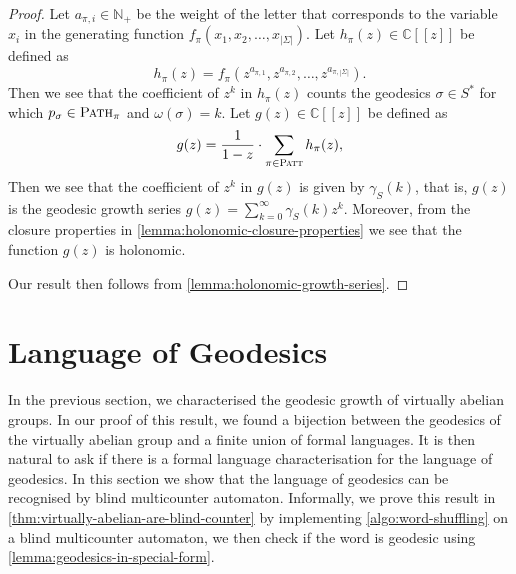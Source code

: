 \begin{proof}
Let $a_{\pi,i}\in \mathbb{N}_+$ be the weight of the letter that corresponds to the variable $x_{i}$ in the generating function $f_\pi(x_1,x_2,\ldots,x_{|\Sigma|})$.
Let $h_\pi(z) \in \mathbb{C}[[z]]$ be defined as
\[
	h_\pi(z) =
	f_\pi(z^{a_{\pi,1}}, z^{a_{\pi,2}}, \ldots, z^{a_{\pi,|\Sigma|}}).
\]
Then we see that the coefficient of $z^k$ in $h_\pi(z)$ counts the geodesics $\sigma \in S^*$ for which $p_\sigma \in \textsc{Path}_\pi$ and $\omega(\sigma) = k$.
Let $g(z) \in \mathbb{C}[[z]]$ be defined as
\[
	g(z) = \frac{1}{1-z} \cdot \sum_{\pi \in \textsc{Patt}} h_\pi(z),
\]
Then we see that the coefficient of $z^k$ in $g(z)$ is given by $\gamma_S(k)$, that is, $g(z)$ is the geodesic growth series $g(z) = \sum_{k = 0}^\infty \gamma_S(k) z^k$.
Moreover, from the closure properties in \cref{lemma:holonomic-closure-properties} we see that the function $g(z)$ is holonomic.

Our result then follows from \cref{lemma:holonomic-growth-series}.
\end{proof}

\section{Language of Geodesics}\label{sec:language-of-geodesics}

In the previous section, we characterised the geodesic growth of virtually abelian groups.
In our proof of this result, we found a bijection between the geodesics of the virtually abelian group and a finite union of formal languages.
It is then natural to ask if there is a formal language characterisation for the language of geodesics.
In this section we show that the language of geodesics can be recognised by blind multicounter automaton.
Informally, we prove this result in \cref{thm:virtually-abelian-are-blind-counter} by implementing \cref{algo:word-shuffling} on a blind multicounter automaton, we then check if the word is geodesic using \cref{lemma:geodesics-in-special-form}.

\setcounter{theoremx}{2}
\TheoremBlindMulticounter

